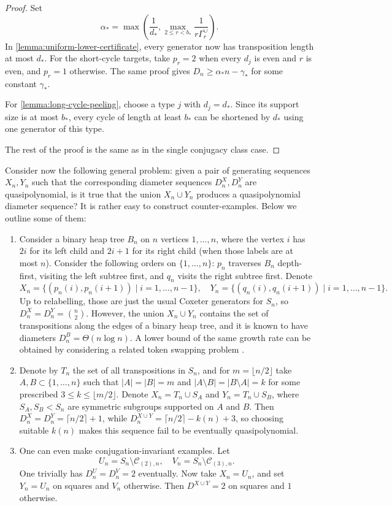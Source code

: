 \documentclass[DIV=12,10pt]{scrartcl}
\theoremstyle{definition}
\newcommand{\cc}{\mathcal{C}}
\begin{document}
\begin{proof}
Set
\begin{equation}
	\label{eq:common-slope-union}
	\alpha_* = \max\left( \frac{1}{d_*}, \max_{2\leqslant r < b_*} \frac{1}{r\Gamma_r^{\cup}} \right).
\end{equation}
In \cref{lemma:uniform-lower-certificate}, every generator now has transposition length at most $d_*$. For the short-cycle targets, take $p_r=2$ when every $d_j$ is even and $r$ is even, and $p_r=1$ otherwise. The same proof gives $D_n \geqslant \alpha_* n-\gamma_*$ for some constant $\gamma_*$.

For \cref{lemma:long-cycle-peeling}, choose a type $j$ with $d_j=d_*$. Since its support size is at most $b_*$, every cycle of length at least $b_*$ can be shortened by $d_*$ using one generator of this type.

The rest of the proof is the same as in the single conjugacy class case.
\end{proof}

Consider now the following general problem: given a pair of generating sequences $X_n, Y_n$ such that the corresponding diameter sequences $D^X_n,D^Y_n$ are quasipolynomial, is it true that the union $X_n\cup Y_n$ produces a quasipolynomial diameter sequence? It is rather easy to construct counter-examples. Below we outline some of them:
\begin{enumerate}
\item Consider a binary heap tree $B_n$ on $n$ vertices $1,\ldots,n$, where the vertex $i$ has $2i$ for its left child and $2i+1$ for its right child (when those labels are at most $n$). Consider the following orders on $\{1,\ldots,n\}$: $p_n$ traverses $B_n$ depth-first, visiting the left subtree first, and $q_n$ visits the right subtree first. Denote
\[
	X_n = \big\{ (p_n(i),p_n(i+1)) \mid i=1,\ldots,n-1 \big\}, \quad
	Y_n = \big\{ (q_n(i),q_n(i+1)) \mid i=1,\ldots,n-1 \big\}.
\]
Up to relabelling, those are just the usual Coxeter generators for $S_n$, so $D^X_n=D^Y_n = \binom{n}{2}$. However, the union $X_n\cup Y_n$ contains the set of transpositions along the edges of a binary heap tree, and it is known to have diameters $D^B_n = \Theta(n\log n)$. A lower bound of the same growth rate can be obtained by considering a related token swapping problem \cite{TokenSwappingOnTrees}.
\item Denote by $T_n$ the set of all transpositions in $S_n$, and for $m=\lfloor n/2\rfloor$ take $A,B\subset\{1,\ldots,n\}$ such that $|A|=|B|=m$ and $|A\setminus B|=|B\setminus A| = k$ for some prescribed $3\leqslant k\leqslant\lfloor m/2\rfloor$. Denote $X_n = T_n \cup S_A$ and $Y_n = T_n\cup S_B$, where $S_A,S_B<S_n$ are symmetric subgroups supported on $A$ and $B$. Then $D^X_n=D^Y_n = \lceil n/2\rceil+1$, while $D^{X\cup Y}_n = \lceil n/2\rceil -k(n)+3$, so choosing suitable $k(n)$ makes this sequence fail to be eventually quasipolynomial.
\item One can even make conjugation-invariant examples. Let
\[
	U_n = S_n \setminus \cc_{(2),n}, \quad V_n = S_n \setminus \cc_{(3),n}.
\]
One trivially has $D^U_n=D^V_n=2$ eventually. Now take $X_n=U_n$, and set $Y_n = U_n$ on squares and $V_n$ otherwise. Then $D^{X\cup Y}=2$ on squares and $1$ otherwise.
\end{enumerate}
\end{document}
